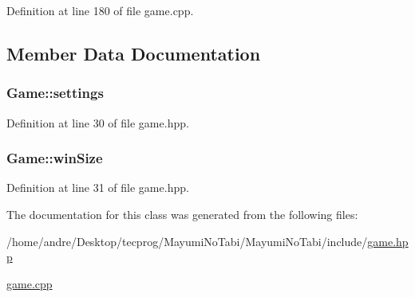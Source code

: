 Definition at line 180 of file game.\-cpp.



\subsection{Member Data Documentation}
\hypertarget{class_game_aebf5de99fd38318e935596f986c65471}{
\subsubsection[{settings}]{ Game\-::settings}}\label{class_game_aebf5de99fd38318e935596f986c65471}


Definition at line 30 of file game.\-hpp.

\hypertarget{class_game_a6532769a81b305319cd44405c23ad0fd}{
\subsubsection[{win\-Size}]{ Game\-::win\-Size}}\label{class_game_a6532769a81b305319cd44405c23ad0fd}


Definition at line 31 of file game.\-hpp.



The documentation for this class was generated from the following files\-:\begin{DoxyCompactItemize}
\item 
/home/andre/\-Desktop/tecprog/\-Mayumi\-No\-Tabi/\-Mayumi\-No\-Tabi/include/\hyperlink{game_8hpp}{game.\-hpp}\item 
\hyperlink{game_8cpp}{game.\-cpp}\end{DoxyCompactItemize}
